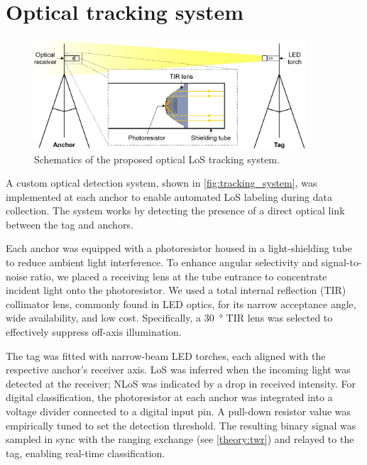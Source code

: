 \chapter{Optical tracking system}\label{tracking_system}

\begin{figure}[tbh]
    \centering
    \includegraphics[width=0.9\textwidth]{Figures/appendices/tracking_system.pdf}
    \caption{Schematics of the proposed optical LoS tracking system.}
    \label{fig:tracking_system}
\end{figure}

A custom optical detection system, shown in \autoref{fig:tracking_system}, was implemented at each anchor to enable automated LoS labeling during data collection. The system works by detecting the presence of a direct optical link between the tag and anchors.

Each anchor was equipped with a photoresistor housed in a light-shielding tube to reduce ambient light interference. To enhance angular selectivity and signal-to-noise ratio, we placed a receiving lens at the tube entrance to concentrate incident light onto the photoresistor. We used a total internal reflection (TIR) collimator lens, commonly found in LED optics, for its narrow acceptance angle, wide availability, and low cost. Specifically, a \SI{30}{\degree} TIR lens was selected to effectively suppress off-axis illumination.

The tag was fitted with narrow-beam LED torches, each aligned with the respective anchor's receiver axis. LoS was inferred when the incoming light was detected at the receiver; NLoS was indicated by a drop in received intensity. For digital classification, the photoresistor at each anchor was integrated into a voltage divider connected to a digital input pin. A pull-down resistor value was empirically tuned to set the detection threshold. The resulting binary signal was sampled in sync with the ranging exchange (see \autoref{theory:twr}) and relayed to the tag, enabling real-time classification.

